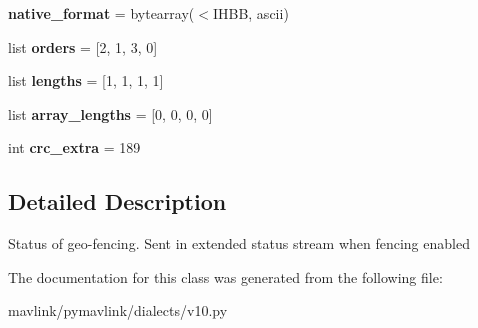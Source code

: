 \begin{DoxyCompactItemize}
{\bfseries native\+\_\+format} = bytearray(\textquotesingle{}$<$I\+H\+BB\textquotesingle{}, \textquotesingle{}ascii\textquotesingle{})
\item 
\mbox{\label{classpymavlink_1_1dialects_1_1v10_1_1MAVLink__fence__status__message_a987f898b44766db0cfbdb949f4e1c66f}} 
list {\bfseries orders} = \mbox{[}2, 1, 3, 0\mbox{]}
\item 
\mbox{\label{classpymavlink_1_1dialects_1_1v10_1_1MAVLink__fence__status__message_afcd74ce42bebe5fcfd265fe5bbd1dc23}} 
list {\bfseries lengths} = \mbox{[}1, 1, 1, 1\mbox{]}
\item 
\mbox{\label{classpymavlink_1_1dialects_1_1v10_1_1MAVLink__fence__status__message_a45f0ec49b119799c063832c1283160af}} 
list {\bfseries array\+\_\+lengths} = \mbox{[}0, 0, 0, 0\mbox{]}
\item 
\mbox{\label{classpymavlink_1_1dialects_1_1v10_1_1MAVLink__fence__status__message_a99a9e1f8b082b30377dae68c36b24de6}} 
int {\bfseries crc\+\_\+extra} = 189
\end{DoxyCompactItemize}


\subsection{Detailed Description}
\begin{DoxyVerb}Status of geo-fencing. Sent in extended status stream when
fencing enabled
\end{DoxyVerb}
 

The documentation for this class was generated from the following file\+:\begin{DoxyCompactItemize}
\item 
mavlink/pymavlink/dialects/v10.\+py\end{DoxyCompactItemize}
